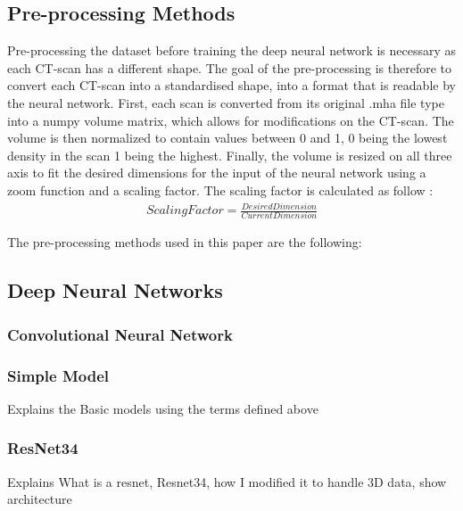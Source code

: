 \documentclass[12pt, letterpaper]{article}
\begin{document}
\subsection{Pre-processing Methods}

Pre-processing the dataset before training the deep neural network is necessary as each CT-scan has a different shape. The goal of the pre-processing is therefore to convert each CT-scan into a standardised shape, into a format that is readable by the neural network. First, each scan is converted from its original .mha file type into a numpy volume matrix, which allows for modifications on the CT-scan. The volume is then normalized to contain values between 0 and 1, 0 being the lowest density in the scan 1 being the highest. Finally, the volume is resized on all three axis to fit the desired dimensions for the input of the neural network using a zoom function and a scaling factor. The scaling factor is calculated as follow : \begin{align}
    Scaling Factor = \frac{Desired Dimension}{Current Dimension}
\end{align}

The pre-processing methods used in this paper are the following:


\subsection{Deep Neural Networks}
\subsubsection{Convolutional Neural Network}

\subsubsection{Simple Model}
Explains the Basic models using the terms defined above
\subsubsection{ResNet34}
Explains What is a resnet, Resnet34, how I modified it to handle 3D data, show architecture
\end{document}

